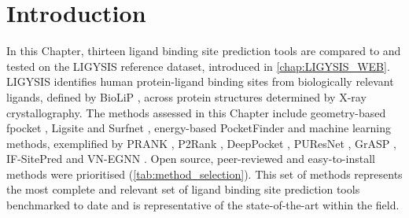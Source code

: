 \section{Introduction}

In this Chapter, thirteen ligand binding site prediction tools are compared to and tested on the LIGYSIS reference dataset, introduced in \autoref{chap:LIGYSIS_WEB}. LIGYSIS identifies human protein-ligand binding sites from biologically relevant ligands, defined by BioLiP \cite{YANG_2013_BIOLIP}, across protein structures determined by X-ray crystallography. The methods assessed in this Chapter include geometry-based fpocket \cite{GUILLOUX_2009_FPOCKET}, Ligsite \cite{HENDLICH_1997_LIGSITE} and Surfnet \cite{LASKOWSKI_1995_SURFNET}, energy-based PocketFinder \cite{AN_2005_POCKETFINDER} and machine learning methods, exemplified by PRANK \cite{KRIVAK_2015_PRANK}, P2Rank \cite{KRIVAK_2015_P2RANK, KRIVAK_2018_P2RANK}, DeepPocket \cite{AGGARWAL_2022_DEEPPOCKET}, PUResNet \cite{KANDEL_2021_PURESNET, KANDEL_2024_PURESNET}, GrASP \cite{SMITH_2024_GrASP}, IF-SitePred \cite{CARBERY_2024_IFSP} and VN-EGNN \cite{SESTAK_2024_VNEGNN}. Open source, peer-reviewed and easy-to-install methods were prioritised (\autoref{tab:method_selection}). This set of methods represents the most complete and relevant set of ligand binding site prediction tools benchmarked to date and is representative of the state-of-the-art within the field.

